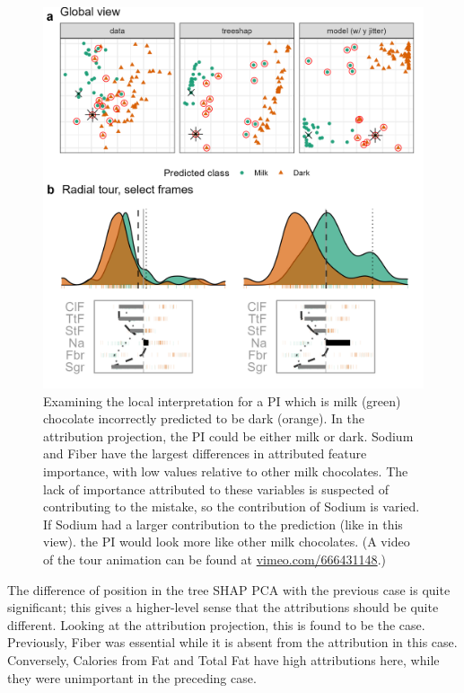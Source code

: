 \documentclass[
]{article}
\begin{document}
\begin{figure}

{\centering \includegraphics[width=1\linewidth]{./figures/case_chocolates_inverse} 

}

\caption{Examining the local interpretation for a PI which is milk (green) chocolate incorrectly predicted to be dark (orange). In the attribution projection, the PI could be either milk or dark. Sodium and Fiber have the largest differences in attributed feature importance, with low values relative to other milk chocolates. The lack of importance attributed to these variables is suspected of contributing to the mistake, so the contribution of Sodium is varied. If Sodium had a larger contribution to the prediction (like in this view). the PI would look more like other milk chocolates. (A video of the tour animation can be found at \href{https://vimeo.com/666431148}{vimeo.com/666431148}.)}\label{fig:casechocolatesinverse}
\end{figure}

The difference of position in the tree SHAP PCA with the previous case is quite significant; this gives a higher-level sense that the attributions should be quite different. Looking at the attribution projection, this is found to be the case. Previously, Fiber was essential while it is absent from the attribution in this case. Conversely, Calories from Fat and Total Fat have high attributions here, while they were unimportant in the preceding case.
\end{document}
